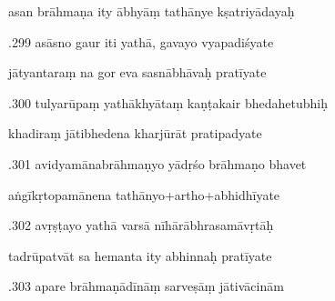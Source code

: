 \documentclass[article,12pt,a4paper]{memoir}%
\newcounter{parCount}
\begin{document}
	  
	  \pstart \leavevmode%
	asan brāhmaṇa ity ābhyāṃ tathānye kṣatriyādayaḥ 
	{}
	\pend%
      

	  
	  \pstart {}.299 asāsno gaur iti yathā, gavayo vyapadiśyate 
	{}
	\pend%
      

	  
	  \pstart \leavevmode%
	jātyantaraṃ na gor eva sasnābhāvaḥ pratīyate 
	{}
	\pend%
      

	  
	  \pstart {}.300 tulyarūpaṃ yathākhyātaṃ kaṇṭakair bhedahetubhiḥ 
	{}
	\pend%
      

	  
	  \pstart \leavevmode%
	khadiraṃ jātibhedena kharjūrāt pratipadyate 
	{}
	\pend%
      

	  
	  \pstart {}.301 avidyamānabrāhmaṇyo yādṛśo brāhmaṇo bhavet 
	{}
	\pend%
      

	  
	  \pstart \leavevmode%
	aṅgīkṛtopamānena tathānyo+artho+abhidhīyate 
	{}
	\pend%
      

	  
	  \pstart {}.302 avṛṣṭayo yathā varsā nīhārābhrasamāvṛtāḥ 
	{}
	\pend%
      

	  
	  \pstart \leavevmode%
	tadrūpatvāt sa hemanta ity abhinnaḥ pratīyate 
	{}
	\pend%
      

	  
	  \pstart {}.303 apare brāhmaṇādīnāṃ sarveṣāṃ jātivācinām 
	{}
	\pend%
      
\end{document}
